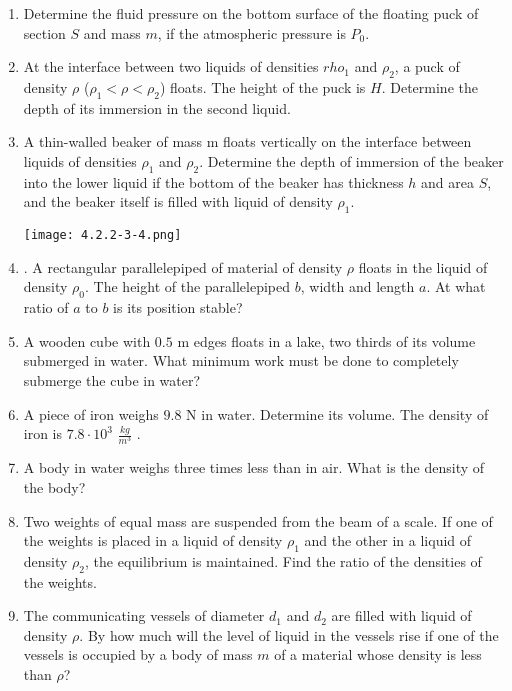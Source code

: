 \documentclass{article}
\begin{document}
\begin{enumerate}[label=4.2.\arabic*]

\item Determine the fluid pressure on the bottom surface of the floating puck of section $S$ and mass $m$, if the atmospheric pressure is $P_0$.  

\item At the interface between two liquids of densities $rho_1$ and $\rho_2$, a puck of density $\rho$ ($\rho_1 < \rho < \rho_2$) floats. The height of the puck is $H$. Determine the depth of its immersion in the second liquid.   

\item A thin-walled beaker of mass m floats vertically on the interface between liquids of densities $\rho_1$ and $\rho_2$. Determine the depth of immersion of the beaker into the lower liquid if the bottom of the beaker has thickness $h$ and area $S$, and the beaker itself is filled with liquid of density $\rho_1$. 
\begin{center}
    \texttt{[image: 4.2.2-3-4.png]}
\end{center}

\item . A rectangular parallelepiped of material of density $\rho$ floats in the liquid of density $\rho_0$. The height of the parallelepiped $b$, width and length $a$. At what ratio of $a$ to $b$ is its position stable?



\item A wooden cube with $0.5$ m edges floats in a lake, two thirds of its volume submerged in water. What minimum work must be done to completely submerge the cube in water?

\item A piece of iron weighs $9.8$ N in water. Determine its volume. The density of iron is $7.8 \cdot 10^3$ $\frac{kg}{m^3}$ .

\item A body in water weighs three times less than in air. What is the density of the body?

\item Two weights of equal mass are suspended from the beam of a scale. If one of the weights is placed in a liquid of density $\rho_1$ and the other in a liquid of density $\rho_2$, the equilibrium is maintained. Find the ratio of the densities of the weights.

\item The communicating vessels of diameter $d_1$ and $d_2$ are filled with liquid of density $\rho$. By how much will the level of liquid in the vessels rise if one of the vessels is occupied by a body of mass $m$ of a material whose density is less than $\rho$?


\end{enumerate}
\end{document}
